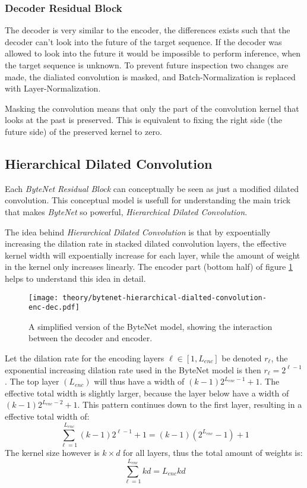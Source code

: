 \subsubsection{Decoder Residual Block}

The decoder is very similar to the encoder, the differences exists such that the decoder can't look into the future of the target sequence. If the decoder was allowed to look into the future it would be impossible to perform inference, when the target sequence is unknown. To prevent future inspection two changes are made‚ the dialiated convolution is masked, and Batch-Normalization is replaced with Layer-Normalization.

Masking the convolution means that only the part of the convolution kernel that looks at the past is preserved. This is equivalent to fixing the right side (the future side) of the preserved kernel to zero.

\subsection{Hierarchical Dilated Convolution}
\label{sec:theory:bytenet:hierarchical-dilated-convolution}

Each \textit{ByteNet Residual Block} can conceptually be seen as just a modified dilated convolution. This conceptual model is usefull for understanding the main trick that makes \textit{ByteNet} so powerful, \textit{Hierarchical Dilated Convolution}.

The idea behind \textit{Hierarchical Dilated Convolution} is that by expoentially increasing the dilation rate in stacked dilated convolution layers, the effective kernel width will expoentially increase for each layer, while the amount of weight in the kernel only increases linearly. The encoder part (bottom half) of figure \ref{fig:bytenet:simplified-hdc} helps to understand this idea in detail.

\begin{figure}[h]
    \centering
    \texttt{[image: theory/bytenet-hierarchical-dialted-convolution-enc-dec.pdf]}
    \caption{A simplified version of the ByteNet model, showing the interaction between the decoder and encoder.}
    \label{fig:bytenet:simplified-hdc}
\end{figure}

Let the dilation rate for the encoding layers $\ell \in [1, L_{enc}]$ be denoted $r_\ell$, the exponential increasing dilation rate used in the ByteNet model is then $r_\ell = 2^{\ell - 1}$. The top layer $(L_{enc})$ will thus have a width of $(k-1) 2^{L_{enc} -1} + 1$. The effective total width is slightly larger, because the layer below have a width of $(k-1) 2^{L_{enc} - 2} + 1$. This pattern continues down to the first layer, resulting in a effective total width of:
\begin{equation}
\sum_{\ell = 1}^{L_{enc}} (k - 1) 2^{\ell-1} + 1 = (k - 1) (2^{L_{enc}} - 1) + 1
\end{equation}
The kernel size however is $k \times d$ for all layers, thus the total amount of weights is:
\begin{equation}
\sum_{\ell = 1}^{L_{enc}} k d = L_{enc} k d
\end{equation}

